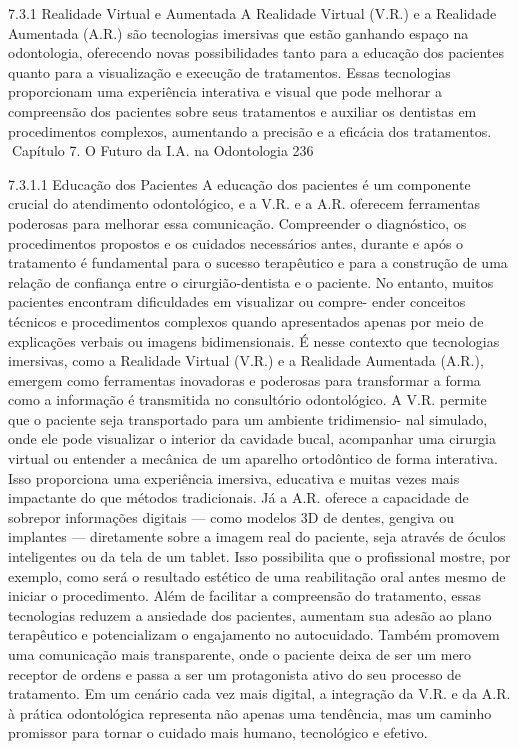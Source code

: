 7.3.1     Realidade Virtual e Aumentada
A Realidade Virtual (V.R.) e a Realidade Aumentada (A.R.) são tecnologias imersivas
que estão ganhando espaço na odontologia, oferecendo novas possibilidades tanto
para a educação dos pacientes quanto para a visualização e execução de tratamentos.
Essas tecnologias proporcionam uma experiência interativa e visual que pode melhorar
a compreensão dos pacientes sobre seus tratamentos e auxiliar os dentistas em
procedimentos complexos, aumentando a precisão e a eficácia dos tratamentos.
Capítulo 7. O Futuro da I.A. na Odontologia                                            236


7.3.1.1   Educação dos Pacientes
A educação dos pacientes é um componente crucial do atendimento odontológico, e
a V.R. e a A.R. oferecem ferramentas poderosas para melhorar essa comunicação.
Compreender o diagnóstico, os procedimentos propostos e os cuidados necessários
antes, durante e após o tratamento é fundamental para o sucesso terapêutico e para a
construção de uma relação de confiança entre o cirurgião-dentista e o paciente.
       No entanto, muitos pacientes encontram dificuldades em visualizar ou compre-
ender conceitos técnicos e procedimentos complexos quando apresentados apenas
por meio de explicações verbais ou imagens bidimensionais.
        É nesse contexto que tecnologias imersivas, como a Realidade Virtual (V.R.) e
a Realidade Aumentada (A.R.), emergem como ferramentas inovadoras e poderosas
para transformar a forma como a informação é transmitida no consultório odontológico.
         A V.R. permite que o paciente seja transportado para um ambiente tridimensio-
nal simulado, onde ele pode visualizar o interior da cavidade bucal, acompanhar uma
cirurgia virtual ou entender a mecânica de um aparelho ortodôntico de forma interativa.
Isso proporciona uma experiência imersiva, educativa e muitas vezes mais impactante
do que métodos tradicionais.
         Já a A.R. oferece a capacidade de sobrepor informações digitais — como
modelos 3D de dentes, gengiva ou implantes — diretamente sobre a imagem real do
paciente, seja através de óculos inteligentes ou da tela de um tablet. Isso possibilita que
o profissional mostre, por exemplo, como será o resultado estético de uma reabilitação
oral antes mesmo de iniciar o procedimento.
        Além de facilitar a compreensão do tratamento, essas tecnologias reduzem a
ansiedade dos pacientes, aumentam sua adesão ao plano terapêutico e potencializam o
engajamento no autocuidado. Também promovem uma comunicação mais transparente,
onde o paciente deixa de ser um mero receptor de ordens e passa a ser um protagonista
ativo do seu processo de tratamento.
        Em um cenário cada vez mais digital, a integração da V.R. e da A.R. à prática
odontológica representa não apenas uma tendência, mas um caminho promissor para
tornar o cuidado mais humano, tecnológico e efetivo.

